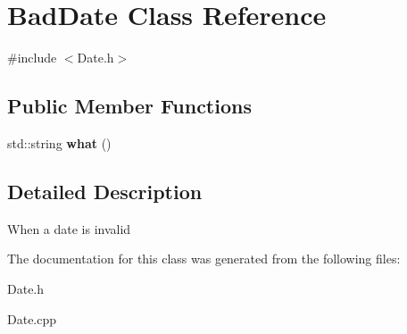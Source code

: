 \hypertarget{class_bad_date}{}\section{Bad\+Date Class Reference}
\label{class_bad_date}


{\ttfamily \#include $<$Date.\+h$>$}

\subsection*{Public Member Functions}
\begin{DoxyCompactItemize}
\item 
\mbox{\label{class_bad_date_a50ea387c6301cf0279943fdc5a7db02d}} 
std\+::string {\bfseries what} ()
\end{DoxyCompactItemize}


\subsection{Detailed Description}
When a date is invalid 

The documentation for this class was generated from the following files\+:\begin{DoxyCompactItemize}
\item 
Date.\+h\item 
Date.\+cpp\end{DoxyCompactItemize}
